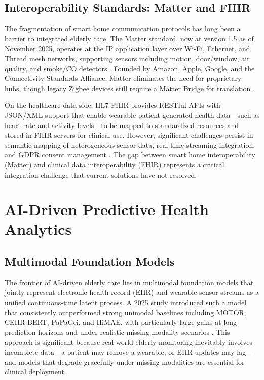 \documentclass[conference]{IEEEtran}
\begin{document}
\subsection{Interoperability Standards: Matter and FHIR}

The fragmentation of smart home communication protocols has long been a barrier to integrated elderly care. The Matter standard, now at version 1.5 as of November 2025, operates at the IP application layer over Wi-Fi, Ethernet, and Thread mesh networks, supporting sensors including motion, door/window, air quality, and smoke/CO detectors \cite{matter_wiki}. Founded by Amazon, Apple, Google, and the Connectivity Standards Alliance, Matter eliminates the need for proprietary hubs, though legacy Zigbee devices still require a Matter Bridge for translation \cite{matter_wiki}.

On the healthcare data side, HL7 FHIR provides RESTful APIs with JSON/XML support that enable wearable patient-generated health data---such as heart rate and activity levels---to be mapped to standardized resources and stored in FHIR servers for clinical use. However, significant challenges persist in semantic mapping of heterogeneous sensor data, real-time streaming integration, and GDPR consent management \cite{pmc_fhir}. The gap between smart home interoperability (Matter) and clinical data interoperability (FHIR) represents a critical integration challenge that current solutions have not resolved.

\section{AI-Driven Predictive Health Analytics}

\subsection{Multimodal Foundation Models}

The frontier of AI-driven elderly care lies in multimodal foundation models that jointly represent electronic health record (EHR) and wearable sensor streams as a unified continuous-time latent process. A 2025 study introduced such a model that consistently outperformed strong unimodal baselines including MOTOR, CEHR-BERT, PaPaGei, and HiMAE, with particularly large gains at long prediction horizons and under realistic missing-modality scenarios \cite{arxiv_multimodal}. This approach is significant because real-world elderly monitoring inevitably involves incomplete data---a patient may remove a wearable, or EHR updates may lag---and models that degrade gracefully under missing modalities are essential for clinical deployment.
\end{document}
